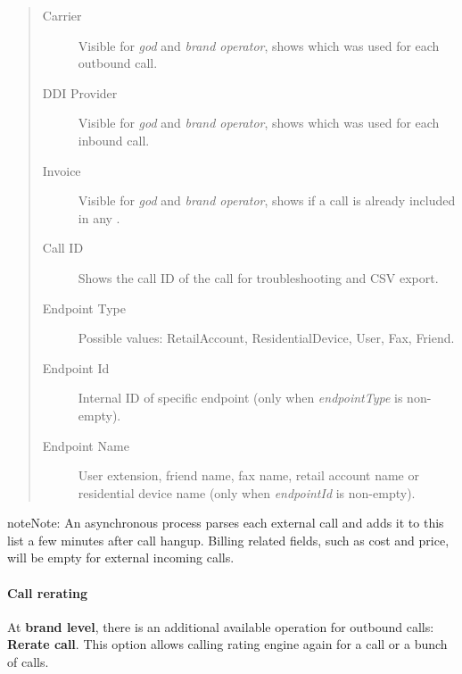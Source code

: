 \documentclass[letterpaper,10pt,english]{sphinxmanual}
\begin{document}
\begin{quote}
\begin{description}
\item[{Carrier}] \leavevmode
Visible for \emph{god} and \emph{brand operator}, shows which {\hyperref[administration_portal/brand/providers/carriers:carriers]{}} was used for each outbound call.

\item[{DDI Provider}] \leavevmode
Visible for \emph{god} and \emph{brand operator}, shows which {\hyperref[administration_portal/brand/providers/ddi_providers:ddi\string-providers]{}} was used for each inbound call.

\item[{Invoice}] \leavevmode
Visible for \emph{god} and \emph{brand operator}, shows if a call is already included in any {\hyperref[administration_portal/brand/invoicing/invoices:invoices]{}}.

\item[{Call ID}] \leavevmode
Shows the call ID of the call for troubleshooting and CSV export.

\item[{Endpoint Type}] \leavevmode
Possible values: RetailAccount, ResidentialDevice, User, Fax, Friend.

\item[{Endpoint Id}] \leavevmode
Internal ID of specific endpoint (only when \emph{endpointType} is non-empty).

\item[{Endpoint Name}] \leavevmode
User extension, friend name, fax name, retail account name or residential device name (only when \emph{endpointId} is non-empty).

\end{description}
\end{quote}

\begin{notice}{note}{Note:}
An asynchronous process parses each external call and adds it to this list a few minutes after call hangup. Billing related fields, such as cost and price, will be empty for external incoming calls.
\end{notice}


\paragraph{Call rerating}
\label{administration_portal/client/retail/calls/call_recordings:call-rerating}
At \textbf{brand level}, there is an additional available operation for outbound calls: \textbf{Rerate call}. This option allows calling rating engine again for a call or a bunch of calls.
\end{document}
